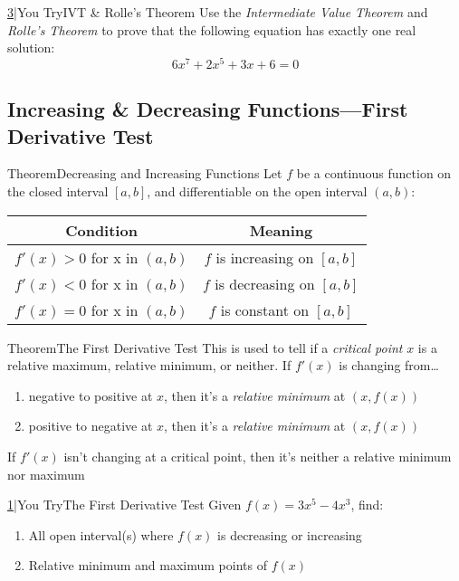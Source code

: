 \documentclass{MathNotes}
\newenvironment{theorem}[1]{\begin{GrayBox}{Theorem}{#1}}{\end{GrayBox}}
\newenvironment{practice}[2]{\begin{PurpleBox}{\texorpdfstring{#1}\Big|You Try}{#2}}{\end{PurpleBox}}
\begin{document}
\begin{practice}{\hyperref[ans:3.2-3]{3}}{IVT \& Rolle's Theorem}\label{prac:3.2-3}
    Use the \textit{Intermediate Value Theorem} and \textit{Rolle's Theorem} to
    prove that the following equation has exactly one real solution:
    $$6x^7+2x^5+3x+6=0$$
\end{practice}

\newpage
\subsection{Increasing \& Decreasing Functions---First Derivative Test}\label{sec:3.3}

\begin{theorem}{Decreasing and Increasing Functions}
Let $f$ be a continuous function on the closed interval $[a, b]$, and 
differentiable on the open interval $(a, b)$:\newline
\begin{center}
    \begin{tabular}{|c|c|}
        \hline
        Condition & Meaning\\
        \hline
        $f'(x)>0$ for x in $(a, b)$ & $f$ is increasing on $[a,b]$\\
        $f'(x)<0$ for x in $(a, b)$ & $f$ is decreasing on $[a,b]$\\
        $f'(x)=0$ for x in $(a, b)$ & $f$ is constant on $[a,b]$\\
        \hline
    \end{tabular}
\end{center}
\end{theorem}

\begin{theorem}{The First Derivative Test}
    This is used to tell if a \textit{critical point} $x$ is a relative 
    maximum, relative minimum, or neither. If $f'(x)$ is changing from\ldots

    \begin{enumerate}
        \item negative to positive at $x$, then it's a 
            \textit{relative minimum} at $(x, f(x))$
        \item positive to negative at $x$, then it's a 
            \textit{relative minimum} at $(x, f(x))$
    \end{enumerate}
    If $f'(x)$ isn't changing at a critical point, then it's neither a
    relative minimum nor maximum
\end{theorem}
\begin{practice}{\hyperref[ans:3.3-1]{1}}{The First Derivative Test}
    \label{prac:3.3-1}
    Given $\displaystyle f(x)=3x^5-4x^3$, find:
    \begin{enumerate}
        \item All open interval(s) where $f(x)$ is decreasing or increasing
        \item Relative minimum and maximum points of $f(x)$
    \end{enumerate}
\end{practice}
\end{document}
